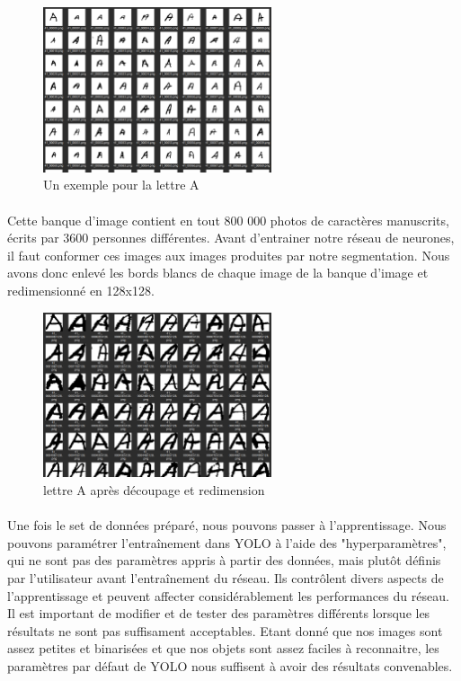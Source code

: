 \documentclass[a4paper]{article}
\begin{document}
			\begin{figure}[h!]
				\centering
				\includegraphics[width=0.6\textwidth]{lettreABDD.png}
				\caption{Un exemple pour la lettre A}
				\label{fig:BDDNIST}
			\end{figure}
		
			\paragraph{} Cette banque d'image contient en tout 800 000 photos de caractères manuscrits, écrits par 3600 personnes différentes. Avant d'entrainer notre réseau de neurones,
			il faut conformer ces images aux images produites par notre segmentation. Nous avons donc enlevé les bords blancs de chaque image de la banque d'image et redimensionné en 128x128.


			\begin{figure}[h!]
				\centering
				\includegraphics[width=0.6\textwidth]{lettreASansBordBDD.png}
				\caption{lettre A après découpage et redimension}
				\label{fig:BDDNISTsansBord}
			\end{figure}

			\paragraph{} Une fois le set de données préparé, nous pouvons passer à l'apprentissage.
			Nous pouvons paramétrer l'entraînement dans YOLO à l'aide des "hyperparamètres", qui ne sont pas des paramètres appris à partir des données, mais plutôt définis par l'utilisateur avant l'entraînement du réseau. Ils contrôlent divers aspects de l'apprentissage et peuvent affecter considérablement les performances du réseau.
			Il est important de modifier et de tester des paramètres différents lorsque les résultats ne sont pas suffisament acceptables.
			Etant donné que nos images sont assez petites et binarisées et que nos objets sont assez faciles à reconnaitre, les paramètres par défaut de YOLO nous suffisent à avoir des résultats convenables.
\end{document}
